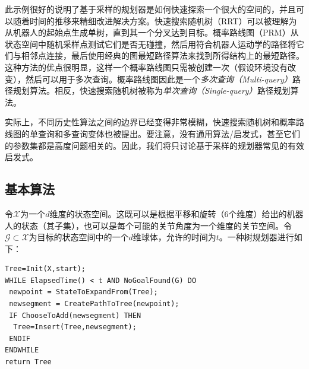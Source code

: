 此示例很好的说明了基于采样的规划器是如何快速探索一个很大的空间的，并且可以随着时间的推移来精细改进解决方案。快速搜索随机树（RRT）可以被理解为从机器人的起始点生成单树，直到其一个分叉达到目标。概率路线图（PRM）从状态空间中随机采样点测试它们是否无碰撞，然后用符合机器人运动学的路径将它们与相邻点连接，最后使用经典的图最短路径算法来找到所得结构上的最短路径。这种方法的优点很明显，这样一个概率路线图只需被创建一次（假设环境没有改变），然后可以用于多次查询。概率路线图因此是一个\emph{多次查询（Multi-query）}路径规划算法。相反，快速搜索随机树被称为\emph{单次查询（Single-query）}路径规划算法。


实际上，不同历史性算法之间的边界已经变得非常模糊，快速搜索随机树和概率路线图的单查询和多查询变体也被提出。要注意，没有通用算法/启发式，甚至它们的参数集都是高度问题相关的。因此，我们将只讨论基于采样的规划器常见的有效启发式。

\subsection{基本算法}

令$\mathcal{X}$为一个$d$维度的状态空间。这既可以是根据平移和旋转（6个维度）给出的机器人的状态（其子集），也可以是每个可能的关节角度为一个维度的关节空间。令$\mathcal{G}\subset\mathcal{X}$为目标的状态空间中的一个$d$维球体，允许的时间为$t$。一种树规划器进行如下：

\begin{verbatim}
Tree=Init(X,start);
WHILE ElapsedTime() < t AND NoGoalFound(G) DO
 newpoint = StateToExpandFrom(Tree);
 newsegment = CreatePathToTree(newpoint);
 IF ChooseToAdd(newsegment) THEN
  Tree=Insert(Tree,newsegment);
 ENDIF
ENDWHILE
return Tree
\end{verbatim}

